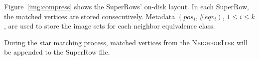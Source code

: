 Figure~\ref{img:compress} shows the SuperRows' on-disk layout.
In each SuperRow, the matched vertices are stored consecutively.
Metadata $(pos_i, \#eqv_i)$, $ 1 \le i \le k$, are used to store the image sets for each neighbor equivalence class.

During the star matching process, matched vertices from the \textsc{NeighborIter} will be appended to the SuperRow file.



